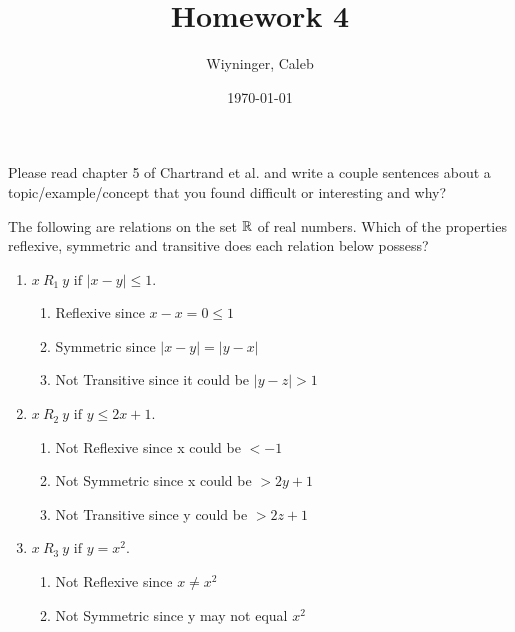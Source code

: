 \documentclass{homework}
\author{Wiyninger, Caleb}  %
\date{\today}  %
\title{Homework 4}
\begin{document}
 \maketitle

\question Please read chapter 5 of Chartrand et al. and write a couple sentences about a topic/example/concept that you found difficult or interesting and why?

\begin{sol}
  
\end{sol}

\question The following are relations on the set $\mathbb{R}$ of real numbers. Which of the properties reflexive, symmetric and transitive does each relation below possess?
\begin{enumerate}[label=(\alph*)]
	\item $x \ R_1 \ y \text{ if } |x - y| \leq 1$.
        \begin{sol}
            \begin{enumerate}
                \item Reflexive since $x-x=0\leq1$
                \item Symmetric since $|x-y|=|y-x|$
                \item Not Transitive since it could be $|y-z|>1$
            \end{enumerate}
        \end{sol}
	\item $x \ R_2 \ y \text{ if } y \leq 2x + 1$.
        \begin{sol}
            \begin{enumerate}
              \item Not Reflexive since x could be $< -1$
              \item Not Symmetric since x could be $> 2y+1$
              \item Not Transitive since y could be $> 2z+1$
            \end{enumerate}
        \end{sol}
	\item $x \ R_3 \ y \text{ if } y = x^2$.
        \begin{sol}
            \begin{enumerate}
              \item Not Reflexive since $x\neq x^2$
              \item Not Symmetric since y may not equal $x^2$

\end{enumerate}
\end{sol}
\end{enumerate}
\end{document}
